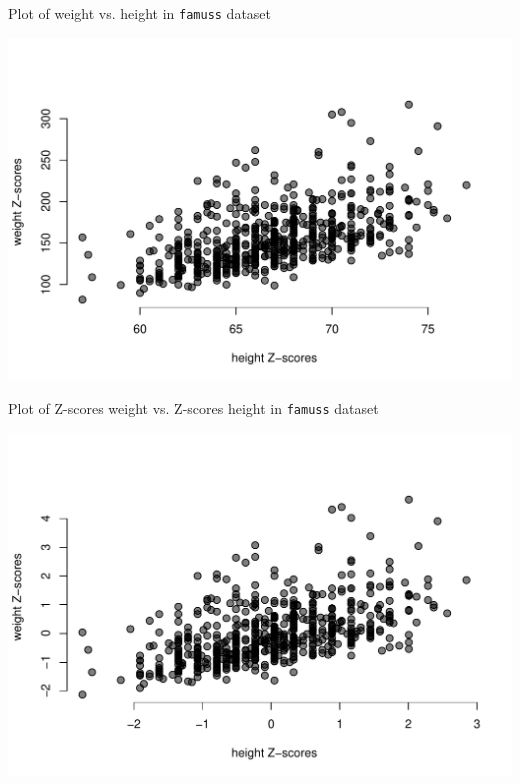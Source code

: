 \documentclass[10pt,handout]{beamer}\usepackage[]{graphicx}\usepackage[]{color}
\makeatletter
\def\maxwidth{ %
  \ifdim\Gin@nat@width>\linewidth
    \linewidth
  \else
    \Gin@nat@width
  \fi
}
\newenvironment{knitrout}{}{} %
\makeatother
\begin{document}
\begin{frame}[fragile]{Plot of weight vs. height in \texttt{famuss} dataset}
	
\begin{knitrout}\tiny
{}\color{fgcolor}

{\centering \includegraphics[width=\maxwidth]{figure/unnamed-chunk-1-1} 

}



\end{knitrout}
	
\end{frame}


\begin{frame}[fragile]{Plot of Z-scores weight vs. Z-scores height in \texttt{famuss} dataset}

\begin{knitrout}\tiny
{}\color{fgcolor}

{\centering \includegraphics[width=\maxwidth]{figure/unnamed-chunk-2-1} 

}



\end{knitrout}

\end{frame}
\end{document}
